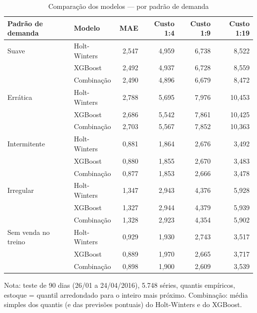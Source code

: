 \begin{table}[htbp]
\centering
\small
\caption{Comparação dos modelos — por padrão de demanda}
\label{tab:comp_por_classe}
\begin{tabular}{llrrrr}
\toprule
Padrão de demanda & Modelo & MAE & Custo 1:4 & Custo 1:9 & Custo 1:19 \\
\midrule
Suave & Holt-Winters & 2,547 & 4,959 & 6,738 & 8,522 \\
 & XGBoost & 2,492 & 4,937 & 6,728 & 8,559 \\
 & Combinação & 2,490 & 4,896 & 6,679 & 8,472 \\
\addlinespace
Errática & Holt-Winters & 2,788 & 5,695 & 7,976 & 10,453 \\
 & XGBoost & 2,686 & 5,542 & 7,861 & 10,425 \\
 & Combinação & 2,703 & 5,567 & 7,852 & 10,363 \\
\addlinespace
Intermitente & Holt-Winters & 0,881 & 1,864 & 2,676 & 3,492 \\
 & XGBoost & 0,880 & 1,855 & 2,670 & 3,483 \\
 & Combinação & 0,877 & 1,853 & 2,666 & 3,478 \\
\addlinespace
Irregular & Holt-Winters & 1,347 & 2,943 & 4,376 & 5,928 \\
 & XGBoost & 1,327 & 2,944 & 4,379 & 5,939 \\
 & Combinação & 1,328 & 2,923 & 4,354 & 5,902 \\
\addlinespace
Sem venda no treino & Holt-Winters & 0,929 & 1,930 & 2,743 & 3,517 \\
 & XGBoost & 0,889 & 1,970 & 2,665 & 3,717 \\
 & Combinação & 0,898 & 1,900 & 2,609 & 3,539 \\
\bottomrule
\end{tabular}
\par\smallskip
{\footnotesize Nota: teste de 90 dias (26/01 a 24/04/2016), 5.748 séries, quantis empíricos, estoque = quantil arredondado para o inteiro mais próximo. Combinação: média simples dos quantis (e das previsões pontuais) do Holt-Winters e do XGBoost.}
\end{table}
